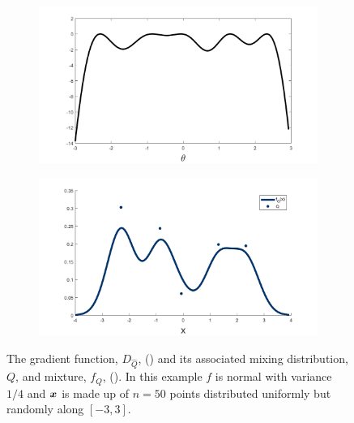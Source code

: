 
	\begin{figure}[ht]
		\begin{subfigure}[t]{0.49\textwidth}
			\centering
			\includegraphics[width = \textwidth]{Figures/Mixtures/D_Q_example.png}
			\caption{}\label{subfig:D_Q}
		\end{subfigure}
		\begin{subfigure}[t]{0.49\textwidth}
			\centering
			\includegraphics[width = \textwidth]{Figures/Mixtures/D_Q_example_mixture.png}
			\caption{}\label{subfig:D_Qmixture}
		\end{subfigure}
		\caption[The gradient function and its associated mixing distribution and mixture.]{The gradient function, $D_{\hat{Q}}$, () and its associated mixing distribution, $Q$, and mixture, $f_Q$, (). In this example $f$ is normal with variance $1/4$ and ${\bm{{x}}}$ is made up of $n = 50$ points distributed uniformly but randomly along $[-3, 3]$.}
		\label{fig:D_Q example}
	\end{figure}

